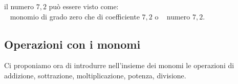 \begin{esempio}{}{}
il numero \(7,2\) può essere visto come:\\ 
~ monomio di grado zero che di coefficiente \(7,2\) 
\quad o \quad 
{}~ numero \(7,2\).
\end{esempio}


\begin{comment}


\subsection{Valore di un monomio}
\label{subsec:monomi_valore}

Poiché il monomio è un'espressione letterale,
possiamo calcolarne il valore quando alle sue variabili sostituiamo 
numeri.

\begin{esempio}{}{}
 Calcola il valore del monomio~\(3x^{4}y^{5}z\) per i valori~\(x=-3\), 
\(y=5\) 
e~\(z=0\).

Sostituendo i valori assegnati 
otteniamo~\(3\cdot (-3)^{4}\cdot 5^{5}\cdot 0=0\) 
essendo uno dei fattori nullo.
\end{esempio}


\begin{osservazione}{}{} 
Il valore di un monomio è nullo quando almeno una 
delle sue 
variabili assume il valore~0.
\end{osservazione}


Molte formule di geometria sono scritte sotto forma di monomi: area del
triangolo~\(\frac{1}{2}bh\) area del quadrato~\(l^{2}\)
perimetro del quadrato~\(4l\) area del rettangolo~\(bh\) volume del 
cubo~\(l^{3}\) ecc.
Esse acquistano significato quando alle lettere sostituiamo
numeri che rappresentano le misure della figura considerata.


\end{comment}


\subsection{Operazioni con i monomi}
\label{subsec:monomi_operazioni}

Ci proponiamo ora di introdurre nell'insieme dei monomi
le operazioni di addizione, sottrazione, moltiplicazione, potenza,
divisione.

